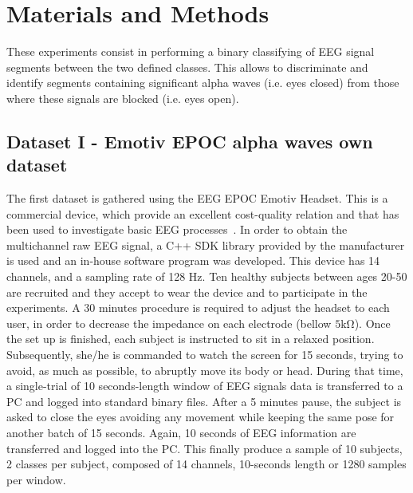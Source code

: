 \section{Materials and Methods}

These experiments consist in performing a binary classifying of EEG signal segments between the two defined classes.  This allows to discriminate and identify segments containing significant alpha waves (i.e. eyes closed) from those where these signals are blocked (i.e. eyes open).


\subsection{Dataset I - Emotiv EPOC alpha waves own dataset}
The first dataset is gathered using the EEG EPOC Emotiv Headset.  This is a commercial device, which provide an excellent cost-quality relation and that has been used to investigate basic EEG processes~\cite{Debener2012,DeVos2014}. In order to obtain the multichannel raw EEG signal, a C++ SDK library provided by the manufacturer is used and an in-house software program was developed. This device has 14 channels, and a sampling rate of 128 \si{Hz}\cite{c11}. Ten healthy subjects between ages 20-50 are recruited and they accept to wear the device and to participate in the experiments.  A 30 minutes procedure is required to adjust the headset to each user, in order to decrease the impedance on each electrode (bellow $5 \si{\kilo\ohm}$).  Once the set up is finished, each subject is instructed to sit in a relaxed position. Subsequently, she/he is commanded to watch the screen for 15 seconds, trying to avoid, as much as possible, to abruptly move its body or head.  During that time, a single-trial of 10 seconds-length window of EEG signals data is transferred to a PC and logged into standard binary files. After a 5 minutes pause, the subject is asked to close the eyes avoiding any movement while keeping the same pose for another batch of 15 seconds.  Again, 10 seconds of EEG information are transferred and logged into the PC. This finally produce a sample of 10 subjects,  2 classes per subject, composed of 14 channels, 10-seconds length or 1280 samples per window. 

   

